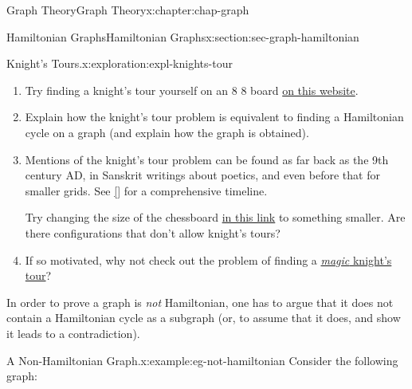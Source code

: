 \documentclass[oneside,10pt,]{book}
\newcommand{\xreffont}{\relax}
\numberwithin{equation}{section}
\begin{document}
\begin{chapterptx}{Graph Theory}{}{Graph Theory}{}{}{x:chapter:chap-graph}
\begin{sectionptx}{Hamiltonian Graphs}{}{Hamiltonian Graphs}{}{}{x:section:sec-graph-hamiltonian}
\begin{exploration}{Knight's Tours.}{x:exploration:expl-knights-tour}
\begin{sidebyside}{1}{0.275}{0.275}{0}
\begin{sbspanel}{0.45}
\end{sbspanel}%
\end{sidebyside}%
\begin{enumerate}[font=\bfseries,label=(\alph*),ref=\alph*]
\item{}Try finding a knight's tour yourself on an 8 \texttimes{} 8 board \href{http://www.maths-resources.com/knights/}{on this website}.%
\item{}Explain how the knight's tour problem is equivalent to finding a Hamiltonian cycle on a graph (and explain how the graph is obtained).%
\item{}Mentions of the knight's tour problem can be found as far back as the 9th century AD, in Sanskrit writings about poetics, and even before that for smaller grids. See \hyperlink{x:biblio:bib-jelliss-2019}{[{\xreffont 4}]} for a comprehensive timeline.%
\par
Try changing the size of the chessboard \href{http://www.maths-resources.com/knights/}{in this link} to something smaller. Are there configurations that don't allow knight's tours?%
\item{}If so motivated, why not check out the problem of finding a \href{http://www.mayhematics.com/t/1d.htm}{\emph{magic} knight's tour}?%
\end{enumerate}
\end{exploration}
In order to prove a graph is \emph{not} Hamiltonian, one has to argue that it does not contain a Hamiltonian cycle as a subgraph (or, to assume that it does, and show it leads to a contradiction).%
\begin{example}{A Non-Hamiltonian Graph.}{x:example:eg-not-hamiltonian}%
Consider the following graph:%
\begin{sidebyside}{1}{0.375}{0.375}{0}%
\begin{sbspanel}{0.25}%
\end{sbspanel}
\end{sidebyside}
\end{example}
\end{sectionptx}
\end{chapterptx}
\end{document}
